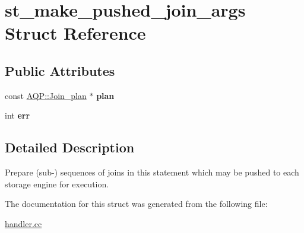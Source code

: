 \hypertarget{structst__make__pushed__join__args}{}\section{st\+\_\+make\+\_\+pushed\+\_\+join\+\_\+args Struct Reference}
\label{structst__make__pushed__join__args}
\subsection*{Public Attributes}
\begin{DoxyCompactItemize}
\item 
\mbox{\label{structst__make__pushed__join__args_a4ec2aa140f3eed17684fa9bba7bc9ceb}} 
const \mbox{\hyperlink{classAQP_1_1Join__plan}{A\+Q\+P\+::\+Join\+\_\+plan}} $\ast$ {\bfseries plan}
\item 
\mbox{\label{structst__make__pushed__join__args_a4e8269e994e9f2258c81c09cc9407230}} 
int {\bfseries err}
\end{DoxyCompactItemize}


\subsection{Detailed Description}
Prepare (sub-\/) sequences of joins in this statement which may be pushed to each storage engine for execution. 

The documentation for this struct was generated from the following file\+:\begin{DoxyCompactItemize}
\item 
\mbox{\hyperlink{handler_8cc}{handler.\+cc}}\end{DoxyCompactItemize}
